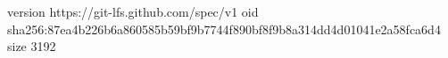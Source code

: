 version https://git-lfs.github.com/spec/v1
oid sha256:87ea4b226b6a860585b59bf9b7744f890bf8f9b8a314dd4d01041e2a58fca6d4
size 3192
